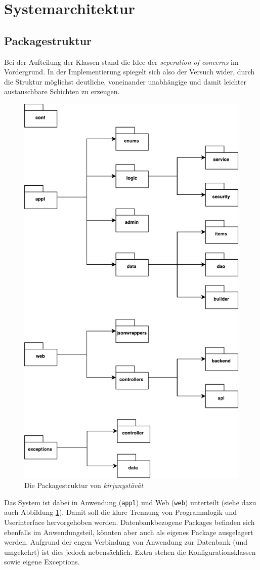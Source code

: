 \section{Systemarchitektur}

\subsection{Packagestruktur}

Bei der Aufteilung der Klassen stand die Idee der \textit{seperation of concerns} im Vordergrund. In der Implementierung spiegelt sich also der Versuch wider, durch die Struktur möglichst deutliche, voneinander unabhängige und damit leichter austauschbare Schichten zu erzeugen.


\begin{figure}[h]
	\centering
	\includegraphics[height=\textwidth,keepaspectratio]{files/packages}
	\caption{Die Packagestruktur von \textit{kirjanystävät}}
	\label{fig:packages}
\end{figure}
\FloatBarrier

Das System ist dabei in Anwendung (\lstinline|appl|) und Web (\lstinline|web|) unterteilt (siehe dazu auch Abbildung \ref{fig:packages}). Damit soll die klare Trennung von Programmlogik und Userinterface hervorgehoben werden. Datenbankbezogene Packages befinden sich ebenfalls im Anwendungsteil, könnten aber auch als eigenes Package ausgelagert werden. Aufgrund der engen Verbindung von Anwendung zur Datenbank (und umgekehrt) ist dies jedoch nebensächlich. Extra stehen die Konfigurationsklassen sowie eigene Exceptions.

